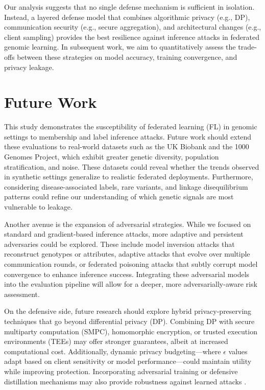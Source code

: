 \documentclass[conference]{IEEEtran}
\begin{document}
Our analysis suggests that no single defense mechanism is sufficient in isolation. Instead, a layered defense model that combines algorithmic privacy (e.g., DP), communication security (e.g., secure aggregation), and architectural changes (e.g., client sampling) provides the best resilience against inference attacks in federated genomic learning. In subsequent work, we aim to quantitatively assess the trade-offs between these strategies on model accuracy, training convergence, and privacy leakage\cite{Mohamad2023SoK51}.

\section{Future Work}

This study demonstrates the susceptibility of federated learning (FL) in genomic settings to membership and label inference attacks. Future work should extend these evaluations to real-world datasets such as the UK Biobank and the 1000 Genomes Project, which exhibit greater genetic diversity, population stratification, and noise. These datasets could reveal whether the trends observed in synthetic settings generalize to realistic federated deployments\cite{federated2024learning12}\cite{altri2025federated53}. Furthermore, considering disease-associated labels, rare variants, and linkage disequilibrium patterns could refine our understanding of which genetic signals are most vulnerable to leakage\cite{Alvarellos2023democrating54}.

Another avenue is the expansion of adversarial strategies. While we focused on standard and gradient-based inference attacks, more adaptive and persistent adversaries could be explored. These include model inversion attacks that reconstruct genotypes or attributes, adaptive attacks that evolve over multiple communication rounds, or federated poisoning attacks that subtly corrupt model convergence to enhance inference success\cite{hannemann2024federated55}\cite{malpetti2025technical56}. Integrating these adversarial models into the evaluation pipeline will allow for a deeper, more adversarially-aware risk assessment\cite{yang2023adversarial50}.

On the defensive side, future research should explore hybrid privacy-preserving techniques that go beyond differential privacy (DP). Combining DP with secure multiparty computation (SMPC), homomorphic encryption, or trusted execution environments (TEEs) may offer stronger guarantees, albeit at increased computational cost\cite{momin2022generalized21}\cite{Mohamad2023SoK51}. Additionally, dynamic privacy budgeting—where $\epsilon$ values adapt based on client sensitivity or model performance—could maintain utility while improving protection\cite{beguier2021differential60}. Incorporating adversarial training or defensive distillation mechanisms may also provide robustness against learned attacks \cite{li2020federated61}.
\end{document}
